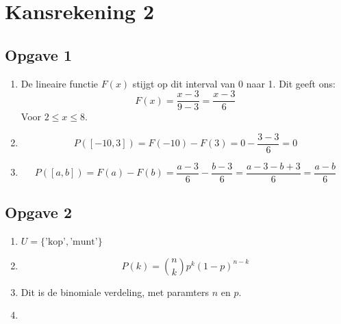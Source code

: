 \documentclass[a4paper,12px]{article}
\begin{document}


\section{Kansrekening 2}

\subsection{Opgave 1}

    \begin{enumerate}[label=(\alph*)]
        \item De lineaire functie $F(x)$ stijgt op dit interval van 0 naar 1. Dit geeft ons:
        \begin{equation}
            F(x)=\dfrac{x-3}{9-3}=\dfrac{x-3}{6}
        \end{equation}
        Voor $2\leq x \leq 8$.
        \item
            \begin{equation}
                P([-10,3])=F(-10)-F(3)=0-\dfrac{3-3}{6}=0
            \end{equation}
        \item
            \begin{equation}
                P([a,b])=F(a)-F(b)=\dfrac{a-3}{6}-\dfrac{b-3}{6}=\dfrac{a-3-b+3}{6}=\dfrac{a-b}{6}
            \end{equation}
    \end{enumerate}

\subsection{Opgave 2}

    \begin{enumerate}[label=(\alph*)]
        \item $U=\{\text{'kop'},\text{'munt'}\}$
        \item
            \begin{equation}
                P(k)=\binom{n}{k}p^k(1-p)^{n-k}
            \end{equation}
        \item Dit is de binomiale verdeling, met paramters $n$ en $p$.
        \item
            \inputminted{python}{2d.py}
    \end{enumerate}
\end{document}
